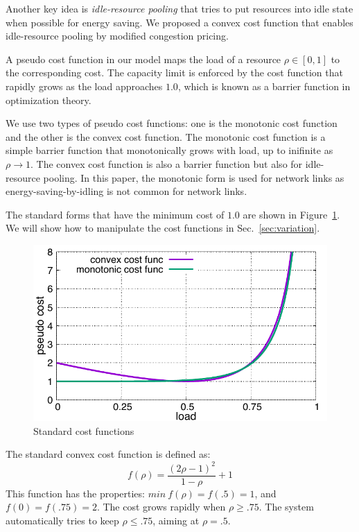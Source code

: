 Another key idea is {\em idle-resource pooling} that tries to put resources
into idle state when possible for energy saving.
We proposed a convex cost function that enables idle-resource pooling
by modified congestion pricing.

A pseudo cost function in our model maps the load of a resource
$\rho \in [0, 1]$ to the corresponding cost.
The capacity limit is enforced by the cost function that rapidly grows
as the load approaches $1.0$, which is known as a barrier function in
optimization theory. 

We use two types of pseudo cost functions: one is the monotonic cost
function and the other is the convex cost function.
The monotonic cost function is a simple barrier function that
monotonically grows with load, up to inifinite as $\rho \to 1$.
The convex cost function is also a barrier function but also for
idle-resource pooling.
In this paper, the monotonic form is used for network links as
energy-saving-by-idling is not common for network links.

The standard forms that have the minimum cost of $1.0$ are
shown in Figure~\ref{fig:std_costfunc}. We will show how to manipulate
the cost functions in Sec.~\ref{sec:variation}.

\begin{figure}[tb]
  \begin{center}
    \includegraphics[width=1.0\columnwidth]{costfunc.pdf}
    \vspace{-2.0ex}
    \caption{Standard cost functions}
    \label{fig:std_costfunc}
  \end{center}
\end{figure}

The standard convex cost function is defined as:
\begin{equation*}
	f(\rho) = \frac{(2\rho - 1)^{2}}{1 - \rho} + 1
\end{equation*}
This function has the properties:
$min\: f(\rho) = f(.5) = 1$, and $f(0) = f(.75) = 2$.
The cost grows rapidly when $\rho \ge .75$.
The system automatically tries to keep $\rho \le .75$,
aiming at $\rho = .5$.

